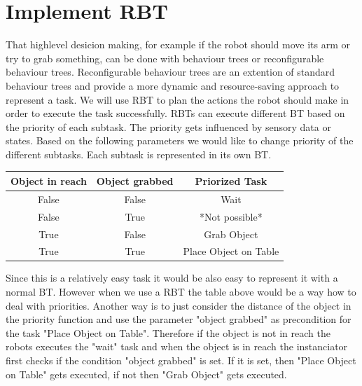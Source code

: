 \documentclass[report]{iisthesis}
\begin{document}
\section{Implement RBT}
\label{implement_rbt}
That highlevel desicion making, for example if the robot should move its arm or try to grab something, can be done with behaviour trees or reconfigurable behaviour trees.
Reconfigurable behaviour trees are an extention of standard behaviour trees and provide a more dynamic and resource-saving approach to represent a task.
We will use RBT to plan the actions the robot should make in order to execute the task successfully. RBTs can execute different BT based on the priority of each subtask. The priority gets influenced by sensory data or states.
Based on the following parameters we would like to change priority of the different subtasks. Each subtask is represented in its own BT.
\begin{center}
    \begin{tabular}{ |c|c||c|  }
        \hline
        Object in reach & Object grabbed & Priorized Task \\
        \hline
        \hline
        False & False & Wait \\
        False & True & *Not possible* \\
        True & False & Grab Object \\ 
        True & True & Place Object on Table \\
        \hline
    \end{tabular}
\end{center}
\noindent
Since this is a relatively easy task it would be also easy to represent it with a normal BT. However when we use a RBT the table above would be a way how to deal with priorities. Another way is to just consider the distance of the object in the priority function and use the parameter "object grabbed" as precondition for the task "Place Object on Table".
Therefore if the object is not in reach the robots executes the "wait" task and when the object is in reach the instanciator first checks if the condition "object grabbed" is set. If it is set, then "Place Object on Table" gets executed, if not then "Grab Object" gets executed.

\end{document}
